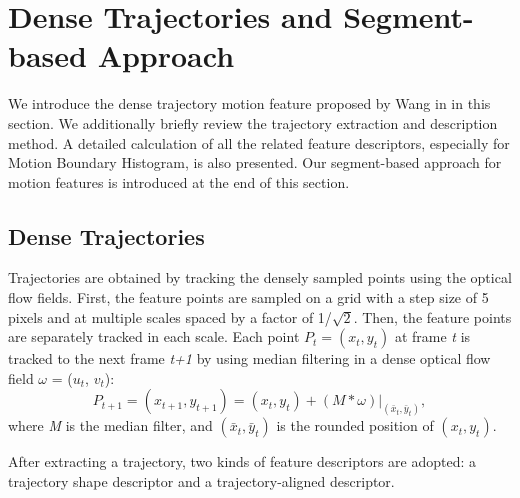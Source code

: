 \section{Dense Trajectories and Segment-based Approach}
\label{sec:1}
We introduce the dense trajectory motion feature proposed by Wang in \cite{wang:2011:inria-00583818:1} in this section. We additionally briefly review the trajectory extraction and description method. A detailed calculation of all the related feature descriptors, especially for Motion Boundary Histogram, is also presented. Our segment-based approach for motion features is introduced at the end of this section.

\subsection{Dense Trajectories}
\label{subsec:1}
Trajectories are obtained by tracking the densely sampled points using the optical flow fields. First, the feature points are sampled on a grid with a step size of 5 pixels and at multiple scales spaced by a factor of 1/$\sqrt{2}$. Then, the feature points are separately tracked in each scale. Each point $P_{t} = (x_{t}, y_{t})$ at frame \textit{t} is tracked to the next frame \textit{t+1} by using median filtering in a dense optical flow field $\omega$ = ($u_{t}$, $v_{t}$):
\begin{equation}
P_{t+1}=(x_{t+1}, y_{t+1})=(x_{t},y_{t}) + (M*\omega)|_{(\bar{x}_{t},\bar{y}_{t})},
\end{equation}
where \textit{M} is the median filter, and $(\bar{x}_{t},\bar{y}_{t})$ is the rounded position of $(x_{t}, y_{t})$.

After extracting a trajectory, two kinds of feature descriptors are adopted: a trajectory shape descriptor and a trajectory-aligned descriptor.

